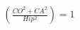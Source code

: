\documentclass[preview]{standalone}
\begin{document}
\begin{align*}
(\frac{CO^2+CA^2}{Hip^2})=1
\end{align*}
\end{document}
